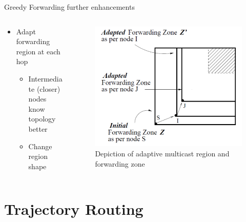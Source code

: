 \documentclass[pdftex]{beamer}
\begin{document}
\begin{frame}{Greedy Forwarding further enhancements}
\begin{columns}
\begin{column}{.5\textwidth}
\begin{itemize}
	\item Adapt forwarding region at each hop \cite{749282}
		\begin{itemize}
			\item Intermediate (closer) nodes know topology better
			\item Change region shape
		\end{itemize}
\end{itemize}
\end{column}

\begin{column}{.5\textwidth}
\begin{figure}
\includegraphics[width=\textwidth]{adaptive_geocast_region}
\caption{Depiction of adaptive multicast region and forwarding zone}
\end{figure}
\end{column}
\end{columns}
\end{frame}


\section{Trajectory Routing}
\end{document}
